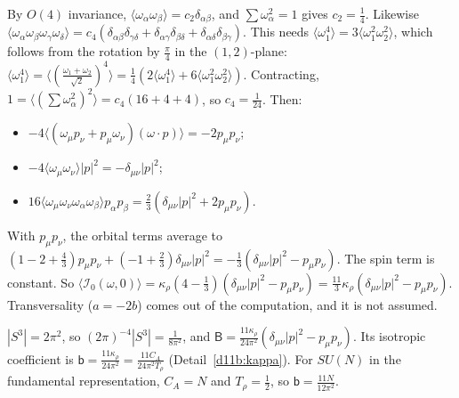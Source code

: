 \begin{step}
By $O(4)$ invariance, $\langle\omega_\alpha\omega_\beta\rangle=c_2\delta_{\alpha\beta}$, and $\sum\omega_\alpha^2=1$ gives $c_2=\frac14$. Likewise $\langle\omega_\alpha\omega_\beta\omega_\gamma\omega_\delta\rangle=c_4(\delta_{\alpha\beta}\delta_{\gamma\delta}+\delta_{\alpha\gamma}\delta_{\beta\delta}+\delta_{\alpha\delta}\delta_{\beta\gamma})$. This needs $\langle\omega_1^4\rangle=3\langle\omega_1^2\omega_2^2\rangle$, which follows from the rotation by $\frac\pi4$ in the $(1,2)$-plane: $\langle\omega_1^4\rangle=\langle(\frac{\omega_1+\omega_2}{\sqrt2})^4\rangle=\frac14(2\langle\omega_1^4\rangle+6\langle\omega_1^2\omega_2^2\rangle)$. Contracting, $1=\langle(\sum\omega_\alpha^2)^2\rangle=c_4(16+4+4)$, so $c_4=\frac1{24}$. Then:
\begin{itemize}
\item $-4\langle(\omega_\mu p_\nu+p_\mu\omega_\nu)(\omega\cdot p)\rangle=-2p_\mu p_\nu$;
\item $-4\langle\omega_\mu\omega_\nu\rangle|p|^2=-\delta_{\mu\nu}|p|^2$;
\item $16\langle\omega_\mu\omega_\nu\omega_\alpha\omega_\beta\rangle p_\alpha p_\beta=\frac23(\delta_{\mu\nu}|p|^2+2p_\mu p_\nu)$.
\end{itemize}
With $p_\mu p_\nu$, the orbital terms average to $(1-2+\frac43)p_\mu p_\nu+(-1+\frac23)\delta_{\mu\nu}|p|^2=-\frac13(\delta_{\mu\nu}|p|^2-p_\mu p_\nu)$. The spin term is constant. So $\langle\mathcal I_0(\omega,0)\rangle=\kappa_\rho(4-\frac13)(\delta_{\mu\nu}|p|^2-p_\mu p_\nu)=\frac{11}3\kappa_\rho(\delta_{\mu\nu}|p|^2-p_\mu p_\nu)$. Transversality ($a=-2b$) comes out of the computation, and it is not assumed.
\end{step}

\begin{step}
$|S^3|=2\pi^2$, so $(2\pi)^{-4}|S^3|=\frac1{8\pi^2}$, and $\mathsf B=\frac{11\kappa_\rho}{24\pi^2}(\delta_{\mu\nu}|p|^2-p_\mu p_\nu)$. Its isotropic coefficient is $\mathsf b=\frac{11\kappa_\rho}{24\pi^2}=\frac{11C_A}{24\pi^2T_\rho}$ (Detail~\ref{d11b:kappa}). For $SU(N)$ in the fundamental representation, $C_A=N$ and $T_\rho=\frac12$, so $\mathsf b=\frac{11N}{12\pi^2}$.
\end{step}

